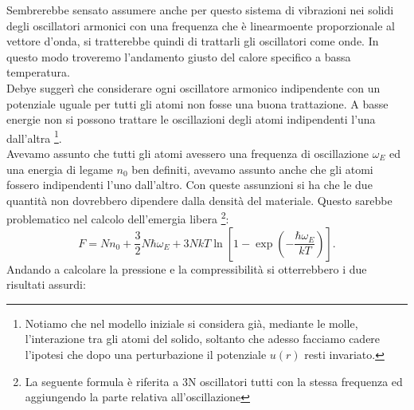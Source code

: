 Sembrerebbe sensato assumere anche per questo sistema di vibrazioni nei solidi degli oscillatori armonici con una frequenza che è linearmoente proporzionale al vettore d'onda, si tratterebbe quindi di trattarli gli oscillatori come onde. In questo modo troveremo l'andamento giusto del calore specifico a bassa temperatura.\\
Debye suggerì che considerare ogni oscillatore armonico indipendente con un potenziale uguale per tutti gli atomi non fosse una buona trattazione. A basse energie non si possono trattare le oscillazioni degli atomi indipendenti l'una dall'altra \footnote{Notiamo che nel modello iniziale si considera già, mediante le molle, l'interazione tra gli atomi del solido, soltanto che adesso facciamo cadere l'ipotesi che dopo una perturbazione il potenziale $u( r) $ resti invariato.}.\\
Avevamo assunto che tutti gli atomi avessero una frequenza di oscillazione $\omega _{E}$ ed una energia di legame $n_0$ ben definiti, avevamo assunto anche che gli atomi fossero indipendenti l'uno dall'altro. Con queste assunzioni si ha che le due quantità non dovrebbero dipendere dalla densità del materiale. Questo sarebbe problematico nel calcolo dell'emergia libera \footnote{La seguente formula è riferita a 3N oscillatori tutti con la stessa frequenza ed aggiungendo la parte relativa all'oscillazione}:
\[
	F = N n_0 + \frac{3}{2}N\hbar \omega _{E} + 3 N kT\ln\left[ 1-\exp\left( -\frac{\hbar \omega _{E}}{kT} \right)  \right] 
.\] 
Andando a calcolare la pressione e la compressibilità si otterrebbero i due risultati assurdi:

